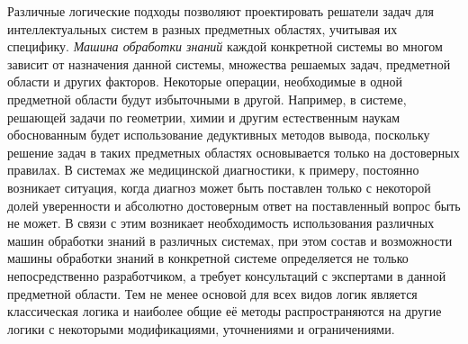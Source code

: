 Различные логические подходы позволяют проектировать решатели задач для интеллектуальных систем в разных предметных областях, учитывая их специфику. \textit{Машина обработки знаний} каждой конкретной системы во многом зависит от назначения данной системы, множества решаемых задач, предметной области и других факторов. Некоторые операции, необходимые в одной предметной области будут избыточными в другой. Например, в системе, решающей задачи по геометрии, химии и другим естественным наукам обоснованным будет использование дедуктивных методов вывода, поскольку решение задач в таких предметных областях основывается только на достоверных правилах. В системах же медицинской диагностики, к примеру, постоянно возникает ситуация, когда диагноз может быть поставлен только с некоторой долей уверенности и абсолютно достоверным ответ на поставленный вопрос быть не может. В связи с этим возникает необходимость использования различных машин обработки знаний в различных системах, при этом состав и возможности машины обработки знаний в конкретной системе определяется не только непосредственно разработчиком, а требует консультаций с экспертами в данной предметной области. Тем не менее основой для всех видов логик является классическая логика и наиболее общие её методы распространяются на другие логики с некоторыми модификациями, уточнениями и ограничениями.

